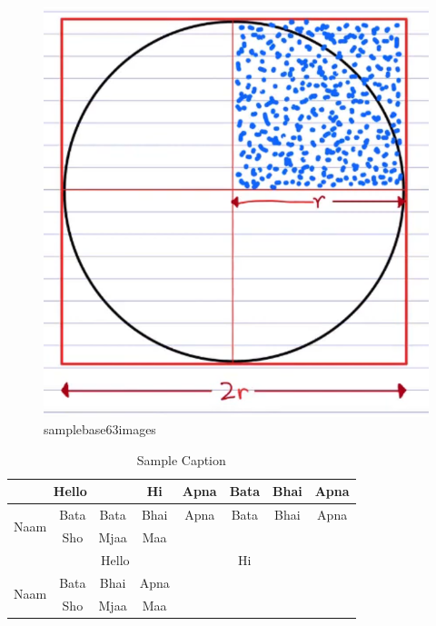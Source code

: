 \documentclass[journal,lettersize]{IEEEtran}%
\begin{document}
    \begin{figure}[!t] 
    \centerline{\includegraphics[width=\linewidth]{image_5.jpeg}}
    \caption{samplebase63images}
    \label{fig:image_5.jpeg}
    \end{figure}
\cite{66a7cc08894ec6cbd7e06be0}
\begin{table}[htbp]
\caption{Sample Caption}
\begin{center}
\begin{tabular}{|c||c||c||c||c||c||c||c|}
\hline
\multicolumn{3}{|c|}{Hello} &Hi &Apna &Bata &Bhai &Apna  \\
\hline
\multirow{2}{*}{Naam} &Bata &Bata &Bhai &Apna &Bata &Bhai &Apna  \\
\hhline{~-------}
 &Sho &Mjaa &Maa & & & &  \\
\hline
\multicolumn{5}{|c|}{Hello} &Hi & &  \\
\hline
\multirow{2}{*}{Naam} &Bata &Bhai &Apna & & & &  \\
\hhline{~-------}
 &Sho &Mjaa &Maa & & & &  \\
\hline

\end{tabular}
\label{table}
\end{center}
\end{table}
\end{document}
